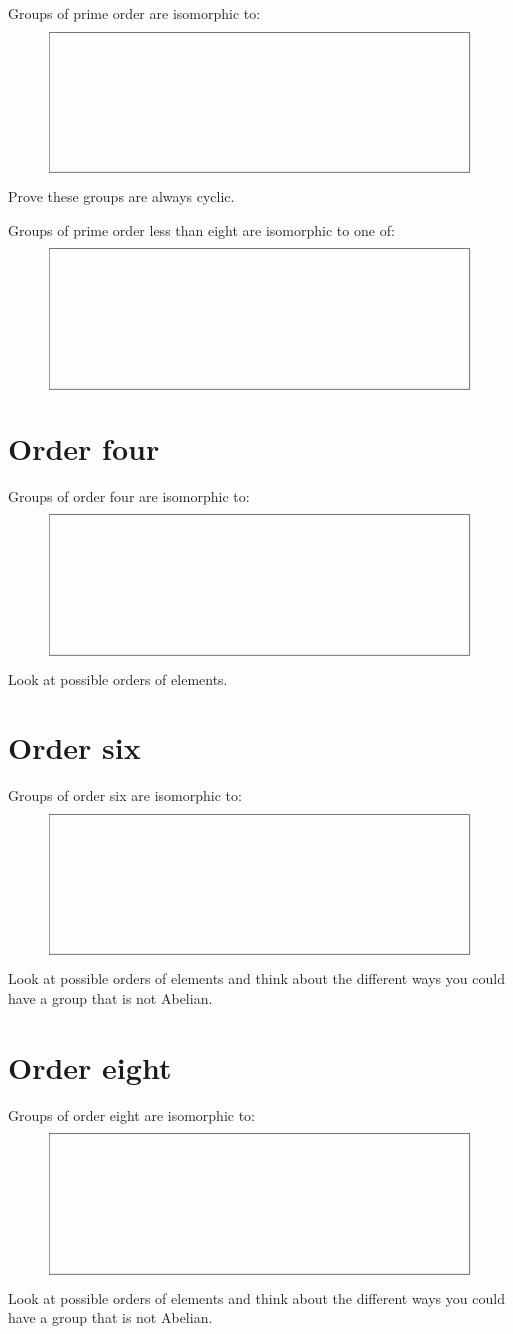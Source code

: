 \documentclass{ximera}
\begin{document}
\begin{lemma}
  Groups of prime order are isomorphic to:
  \[
  \framebox(300,100){}
  \]
  \begin{sketch}
    Prove these groups are always cyclic.
  \end{sketch}
\end{lemma}

\begin{corollary}
  Groups of prime order less than eight are isomorphic to one of:
  \[
  \framebox(300,100){}
  \]
\end{corollary}

\section{Order four}

\begin{lemma}
  Groups of order four are isomorphic to:
  \[
  \framebox(300,100){}
  \]
  \begin{sketch}
    Look at possible orders of elements.
  \end{sketch}
\end{lemma}


\section{Order six}

\begin{lemma}
  Groups of order six are isomorphic to:
  \[
  \framebox(300,100){}
  \]
  \begin{sketch}
    Look at possible orders of elements and think about the different
    ways you could have a group that is not Abelian.
  \end{sketch}
\end{lemma}





\section{Order eight}



\begin{lemma}
  Groups of order eight are isomorphic to:
  \[
  \framebox(300,100){}
  \]
  \begin{sketch}
    Look at possible orders of elements and think about the different
    ways you could have a group that is not Abelian.
  \end{sketch}
\end{lemma}
\end{document}
